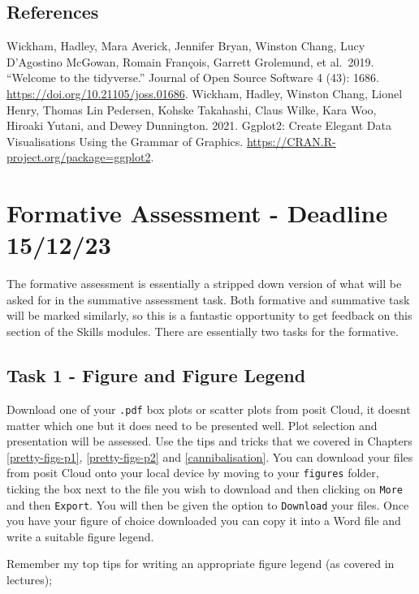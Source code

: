 \documentclass[
]{book}
\begin{document}
\hypertarget{references-7}{%
\section{References}\label{references-7}}

Wickham, Hadley, Mara Averick, Jennifer Bryan, Winston Chang, Lucy D'Agostino McGowan, Romain François, Garrett Grolemund, et al.~2019. ``Welcome to the tidyverse.'' Journal of Open Source Software 4 (43): 1686. \url{https://doi.org/10.21105/joss.01686}.
Wickham, Hadley, Winston Chang, Lionel Henry, Thomas Lin Pedersen, Kohske Takahashi, Claus Wilke, Kara Woo, Hiroaki Yutani, and Dewey Dunnington. 2021. Ggplot2: Create Elegant Data Visualisations Using the Grammar of Graphics. \url{https://CRAN.R-project.org/package=ggplot2}.

\hypertarget{formative}{%
\chapter{Formative Assessment - Deadline 15/12/23}\label{formative}}

The formative assessment is essentially a stripped down version of what will be asked for in the summative assessment task. Both formative and summative task will be marked similarly, so this is a fantastic opportunity to get feedback on this section of the Skills modules. There are essentially two tasks for the formative.

\hypertarget{task-1}{%
\section{Task 1 - Figure and Figure Legend}\label{task-1}}

Download one of your \texttt{.pdf} box plots or scatter plots from posit Cloud, it doesnt matter which one but it does need to be presented well. Plot selection and presentation will be assessed. Use the tips and tricks that we covered in Chapters \ref{pretty-figs-p1}, \ref{pretty-figs-p2} and \ref{cannibalisation}. You can download your files from posit Cloud onto your local device by moving to your \texttt{figures} folder, ticking the box next to the file you wish to download and then clicking on \texttt{More} and then \texttt{Export}. You will then be given the option to \texttt{Download} your files. Once you have your figure of choice downloaded you can copy it into a Word file and write a suitable figure legend.

Remember my top tips for writing an appropriate figure legend (as covered in lectures);
\end{document}

